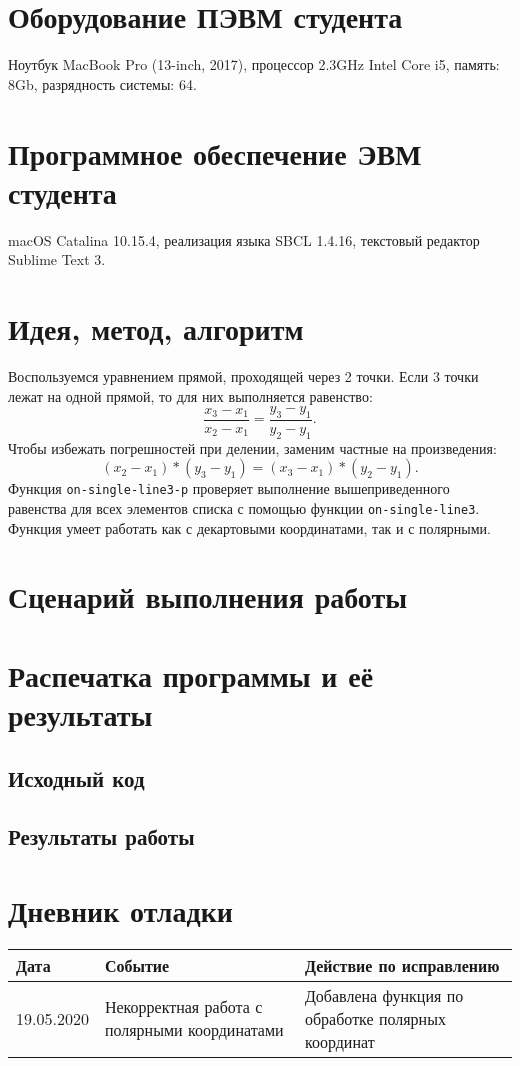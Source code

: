 \documentclass[12pt]{article}
\begin{document}
\section{Оборудование ПЭВМ студента}
Ноутбук MacBook Pro (13-inch, 2017), процессор 2.3GHz Intel Core i5, память: 8Gb, разрядность системы: 64.

\section{Программное обеспечение ЭВМ студента}
macOS Catalina 10.15.4, реализация языка SBCL 1.4.16, текстовый редактор Sublime Text 3.

\section{Идея, метод, алгоритм}
Воспользуемся уравнением прямой, проходящей через 2 точки. Если 3 точки лежат на одной прямой, то для них выполняется равенство:
$$\frac{x_3 - x_1}{x_2 - x_1} = \frac{y_3 - y_1}{y_2 -y_1}.$$
Чтобы избежать погрешностей при делении, заменим частные на произведения:
$$(x_2 - x_1)*(y_3 - y_1) = (x_3 - x_1)*(y_2 - y_1).$$
Функция {\tt on-single-line3-p} проверяет выполнение вышеприведенного равенства для всех элементов списка с помощью функции {\tt on-single-line3}. Функция умеет работать как с декартовыми координатами, так и с полярными.

\section{Сценарий выполнения работы}

\section{Распечатка программы и её результаты}

\subsection{Исходный код}


\subsection{Результаты работы}


\section{Дневник отладки}
\begin{tabular}{|l|p{180pt}|p{180pt}|}
\hline
Дата & Событие & Действие по исправлению \\ \hline
19.05.2020 & Некорректная работа с полярными координатами & Добавлена функция по обработке полярных координат\\
\hline
\end{tabular}
\end{document}
